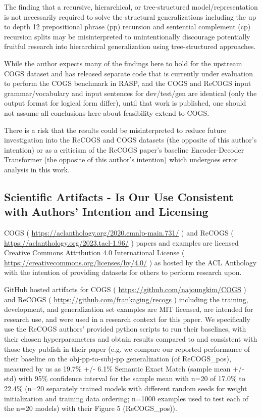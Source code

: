 \documentclass[11pt]{article}
\begin{document}
The finding that a recursive, hierarchical, or tree-structured model/representation is not necessarily required to solve the structural generalizations including the up to depth 12 prepositional phrase (pp) recursion and sentential complement (cp) recursion splits may be misinterpreted to unintentionally discourage potentially fruitful research into hierarchical generalization using tree-structured approaches.

While the author expects many of the findings here to hold for the upstream COGS dataset and has released separate code that is currently under evaluation to perform the COGS benchmark in RASP, and the COGS and ReCOGS input grammar/vocabulary and input sentences for dev/test/gen are identical (only the output format for logical form differ), until that work is published, one should not assume all conclusions here about feasibility extend to COGS.

There is a risk that the results could be misinterpreted to reduce future investigation into the ReCOGS and COGS datasets (the opposite of this author’s intention) or as a criticism of the ReCOGS paper's baseline Encoder-Decoder Transformer (the opposite of this author's intention) which undergoes error analysis in this work.

\subsection{Scientific Artifacts - Is Our Use Consistent with Authors' Intention and Licensing}
\label{scientific_artifacts_use}

COGS \cite{KimLinzen2020} ( \href{https://aclanthology.org/2020.emnlp-main.731/}{https://aclanthology.org/2020.emnlp-main.731/} ) and ReCOGS \cite{Wu2023} ( \href{https://aclanthology.org/2023.tacl-1.96/}{https://aclanthology.org/2023.tacl-1.96/} ) papers and examples are licensed Creative Commons Attribution 4.0 International License ( \href{https://creativecommons.org/licenses/by/4.0/}{https://creativecommons.org/licenses/by/4.0/} ) as hosted by the ACL Anthology with the intention of providing datasets for others to perform research upon. 

GitHub hosted artifacts for COGS ( \href{https://github.com/najoungkim/COGS}{https://github.com/najoungkim/COGS}  ) and ReCOGS ( \href{https://github.com/frankaging/recogs}{https://github.com/frankaging/recogs} ) including the training, development, and generalization set examples are MIT licensed, are intended for research use, and were used in a research context for this paper. We specifically use the ReCOGS authors' provided python scripts to run their baselines, with their chosen hyperparameters and obtain results compared to and consistent with those they publish in their paper (e.g. we compare our reported performance of their baseline on the obj-pp-to-subj-pp generalization (of ReCOGS\_pos), measured by us as 19.7\% +/- 6.1\% Semantic Exact Match (sample mean +/- std) with 95\% confidence interval for the sample mean with n=20 of 17.0\% to 22.4\% (n=20 separately trained models with different random seeds for weight initialization and training data ordering; n=1000 examples used to test each of the n=20 models) with their Figure 5 (ReCOGS\_pos)).
\end{document}
